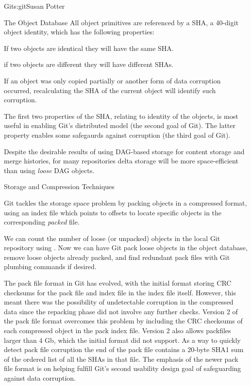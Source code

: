\begin{aosachapter}{Git}{s:git}{Susan Potter}
\begin{aosasect1}{The Object Database}
All object primitives are referenced by a SHA, a 40-digit object identity,
which has the following properties:
\begin{aosaitemize}
  \item If two objects are identical they will have the same SHA.
  \item if two objects are different they will have different SHAs.
  \item If an object was only copied partially or another form of data
        corruption occurred, recalculating the SHA of the current object
        will identify such corruption.
\end{aosaitemize}

The first two properties of the SHA, relating to identity of the objects, is
most useful in enabling Git's distributed model (the second goal of Git).
The latter property enables some safegaurds against corruption (the third
goal of Git).

Despite the desirable results of using DAG-based storage for content
storage and merge histories, for many repositories delta storage will be
more space-efficient than using \emph{loose} DAG objects.

\end{aosasect1}

\begin{aosasect1}{Storage and Compression Techniques}

Git tackles the storage space problem by packing objects in a compressed
format, using an index file which points to offsets to locate specific objects in the
corresponding \emph{packed} file.


We can count the number of loose (or unpacked) objects in the local
Git repository using . Now we can have Git pack
loose objects in the object database, remove loose objects already
packed, and find redundant pack files with Git plumbing commands if desired.

The pack file format in Git has evolved, with the initial format storing
CRC checksums for the pack file and index file in the index file
itself. However, this meant there was the possibility of undetectable
corruption in the compressed data since the repacking phase did not involve any
further checks. Version 2 of the pack file format overcomes this problem by
including the CRC checksums of each compressed object in the pack index
file. Version 2 also allows packfiles larger than 4 Gb, which the initial
format did not support. As a way to quickly detect pack file corruption the
end of the pack file contains a 20-byte SHA1 sum of the ordered list of all
the SHAs in that file.  
The emphasis of the newer pack file format is on helping fulfill Git's second
usability design goal of safeguarding against data corruption.


\end{aosasect1}
\end{aosachapter}
